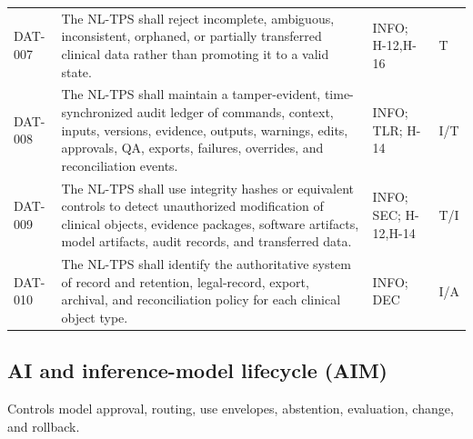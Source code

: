 \documentclass[11pt,letterpaper]{article}
\begin{document}
\begin{small}
\begin{longtable}{@{}L{0.0806\textwidth}L{0.5386\textwidth}L{0.1868\textwidth}L{0.1140\textwidth}@{}}
\addlinespace[2pt]
DAT-007 & The NL-TPS shall reject incomplete, ambiguous, inconsistent, orphaned, or partially transferred clinical data rather than promoting it to a valid state. & INFO; H-12,H-16 & T \\
\addlinespace[2pt]
DAT-008 & The NL-TPS shall maintain a tamper-evident, time-synchronized audit ledger of commands, context, inputs, versions, evidence, outputs, warnings, edits, approvals, QA, exports, failures, overrides, and reconciliation events. & INFO; TLR; H-14 & I\slash\allowbreak{}T \\
\addlinespace[2pt]
DAT-009 & The NL-TPS shall use integrity hashes or equivalent controls to detect unauthorized modification of clinical objects, evidence packages, software artifacts, model artifacts, audit records, and transferred data. & INFO; SEC; H-12,H-14 & T\slash\allowbreak{}I \\
\addlinespace[2pt]
DAT-010 & The NL-TPS shall identify the authoritative system of record and retention, legal-record, export, archival, and reconciliation policy for each clinical object type. & INFO; DEC & I\slash\allowbreak{}A \\
\end{longtable}
\end{small}

\subsection{AI and inference-model lifecycle (AIM)}

Controls model approval, routing, use envelopes, abstention, evaluation, change, and rollback.
\end{document}
